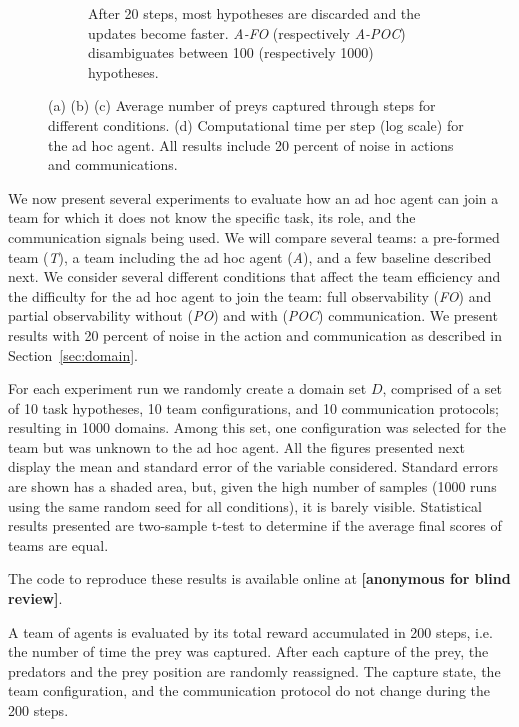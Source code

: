 \begin{figure}[t]
\begin{subfigure}[t]{0.245\textwidth}
    \caption{After 20 steps, most hypotheses are discarded and the updates become faster. \emph{A-FO} (respectively \emph{A-POC}) disambiguates between 100 (respectively 1000) hypotheses.}
    \label{fig:comptime}
  \end{subfigure}
  \caption{(a) (b) (c) Average number of preys captured through steps for different conditions. (d) Computational time per step (log scale) for the ad hoc agent. All results include 20 percent of noise in actions and communications.\vspace{-0.3cm}}
  \label{fig:results}
\end{figure}

We now present several experiments to evaluate how an ad hoc agent can join a team for which it does not know the specific task, its role, and the communication signals being used. We will compare several teams: a pre-formed team (\emph{T}), a team including the ad hoc agent (\emph{A}), and a few baseline described next. We consider several different conditions that affect the team efficiency and the difficulty for the ad hoc agent to join the team: full observability (\emph{FO}) and partial observability without (\emph{PO}) and with (\emph{POC}) communication. We present results with 20 percent of noise in the action and communication as described in Section~\ref{sec:domain}.

For each experiment run we randomly create a domain set $D$, comprised of a set of 10 task hypotheses, 10 team configurations, and 10 communication protocols; resulting in 1000 domains. Among this set, one configuration was selected for the team but was unknown to the ad hoc agent. All the figures presented next display the mean and standard error of the variable considered. Standard errors are shown has a shaded area, but, given the high number of samples (1000 runs using the same random seed for all conditions), it is barely visible. Statistical results presented are two-sample t-test to determine if the average final scores of teams are equal.

The code to reproduce these results is available online at \textbf{[anonymous for blind review]}.

A team of agents is evaluated by its total reward accumulated in 200 steps, i.e. the number of time the prey was captured. After each capture of the prey, the predators and the prey position are randomly reassigned. The capture state, the team configuration, and the communication protocol do not change during the 200 steps.

